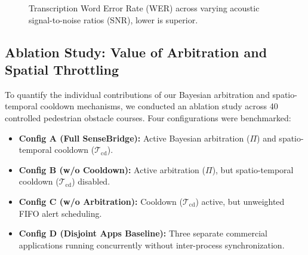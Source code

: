 \documentclass[conference]{IEEEtran}
\begin{document}
\begin{figure}[htbp]
\centering
{}
\caption{Transcription Word Error Rate (WER) across varying acoustic signal-to-noise ratios (SNR), lower is superior.}
\label{fig:snr_wer}
\end{figure}

\subsection{Ablation Study: Value of Arbitration and Spatial Throttling}
To quantify the individual contributions of our Bayesian arbitration and spatio-temporal cooldown mechanisms, we conducted an ablation study across 40 controlled pedestrian obstacle courses. Four configurations were benchmarked:
\begin{itemize}
    \item \textbf{Config A (Full SenseBridge):} Active Bayesian arbitration ($\Pi$) and spatio-temporal cooldown ($\mathcal{T}_{\text{cd}}$).
    \item \textbf{Config B (w/o Cooldown):} Active arbitration ($\Pi$), but spatio-temporal cooldown ($\mathcal{T}_{\text{cd}}$) disabled.
    \item \textbf{Config C (w/o Arbitration):} Cooldown ($\mathcal{T}_{\text{cd}}$) active, but unweighted FIFO alert scheduling.
    \item \textbf{Config D (Disjoint Apps Baseline):} Three separate commercial applications running concurrently without inter-process synchronization.
\end{itemize}
\end{document}
